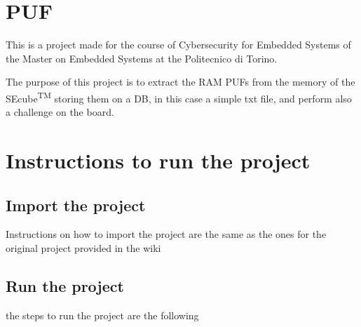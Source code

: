 \section {PUF}
This is a project made for the course of Cybersecurity for Embedded Systems of the Master on Embedded Systems at the Politecnico di Torino.

The purpose of this project is to extract the RAM PUFs from the memory of the SEcube\textsuperscript{TM} storing them on a DB, in this case a simple txt file, and perform also a challenge on the board.

\section {Instructions to run the project}

\subsection {Import the project}
Instructions on how to import the project are the same as the ones for the original project provided in the wiki

\subsection {Run the project}
the steps to run the project are the following


